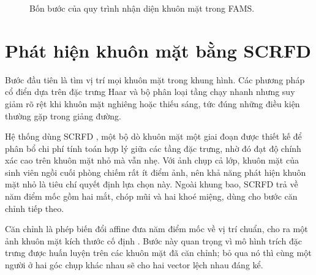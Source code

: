 \begin{figure}[H]
\centering
{}
\caption{Bốn bước của quy trình nhận diện khuôn mặt trong FAMS.}
\label{fig:pipeline}
\end{figure}

\section{Phát hiện khuôn mặt bằng SCRFD}

Bước đầu tiên là tìm vị trí mọi khuôn mặt trong khung hình. Các phương pháp
cổ điển dựa trên đặc trưng Haar và bộ phân loại tầng \cite{Viola2001Rapid}
chạy nhanh nhưng suy giảm rõ rệt khi khuôn mặt nghiêng hoặc thiếu sáng, tức
đúng những điều kiện thường gặp trong giảng đường.

Hệ thống dùng SCRFD \cite{Guo2021SCRFD}, một bộ dò khuôn mặt một giai đoạn
được thiết kế để phân bổ chi phí tính toán hợp lý giữa các tầng đặc trưng,
nhờ đó đạt độ chính xác cao trên khuôn mặt nhỏ mà vẫn nhẹ. Với ảnh chụp cả
lớp, khuôn mặt của sinh viên ngồi cuối phòng chiếm rất ít điểm ảnh, nên khả
năng phát hiện khuôn mặt nhỏ là tiêu chí quyết định lựa chọn này. Ngoài khung
bao, SCRFD trả về năm điểm mốc gồm hai mắt, chóp mũi và hai khoé miệng, dùng
cho bước căn chỉnh tiếp theo.

Căn chỉnh  là phép biến đổi affine đưa năm điểm mốc về vị trí
chuẩn, cho ra một ảnh khuôn mặt kích thước cố định \cite{Wang2021Survey}. Bước này quan trọng vì mô
hình trích đặc trưng được huấn luyện trên các khuôn mặt đã căn chỉnh; bỏ qua
nó thì cùng một người ở hai góc chụp khác nhau sẽ cho hai vector lệch nhau
đáng kể.

